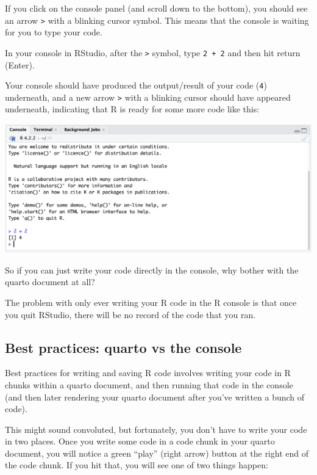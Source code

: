 \documentclass[
  letterpaper,
  DIV=11,
  numbers=noendperiod]{scrreprt}
\begin{document}
If you click on the console panel (and scroll down to the bottom), you
should see an arrow \texttt{\textgreater{}} with a blinking cursor
\texttt{\textbar{}} symbol. This means that the console is waiting for
you to type your code.

In your console in RStudio, after the \texttt{\textgreater{}} symbol,
type \texttt{2\ +\ 2} and then hit return (Enter).

Your console should have produced the output/result of your code
(\texttt{4}) underneath, and a new arrow \texttt{\textgreater{}} with a
blinking cursor should have appeared underneath, indicating that R is
ready for some more code like this:

\includegraphics[width=13.71in,height=\textheight]{figures/console_example.png}

So if you can just write your code directly in the console, why bother
with the quarto document at all?

The problem with only ever writing your R code in the R console is that
once you quit RStudio, there will be no record of the code that you ran.

\subsection{Best practices: quarto vs the
console}\label{best-practices-quarto-vs-the-console}

Best practices for writing and saving R code involves writing your code
in R chunks within a quarto document, and then running that code in the
console (and then later rendering your quarto document after you've
written a bunch of code).

This might sound convoluted, but fortunately, you don't have to write
your code in two places. Once you write some code in a code chunk in
your quarto document, you will notice a green ``play'' (right arrow)
button at the right end of the code chunk. If you hit that, you will see
one of two things happen:
\end{document}
